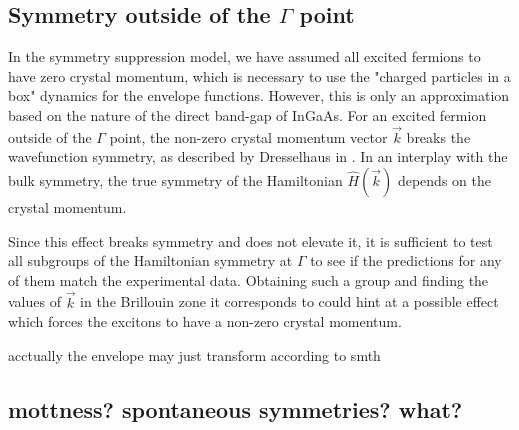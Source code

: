 \subsection{Symmetry outside of the $\Gamma$ point}
In the symmetry suppression model, we have assumed all excited fermions to have zero crystal momentum, which is necessary to use the "charged particles in a box" dynamics for the envelope functions. However, this is only an approximation based on the nature of the direct band-gap of InGaAs. For an excited fermion outside of the $\Gamma$ point, the non-zero crystal momentum vector $\vec{k}$ breaks the wavefunction symmetry, as described by Dresselhaus in \cite[Ch. 13]{dresselhaus}. In an interplay with the bulk symmetry, the true symmetry of the Hamiltonian $\hat{H}\left(\vec{k}\right)$ depends on the crystal momentum.

Since this effect breaks symmetry and does not elevate it, it is sufficient to test all subgroups of the Hamiltonian symmetry at $\Gamma$ to see if the predictions for any of them match the experimental data. Obtaining such a group and finding the values of $\vec{k}$ in the Brillouin zone it corresponds to could hint at a possible effect which forces the excitons to have a non-zero crystal momentum.

acctually the envelope may just transform according to smth

\subsection{mottness? spontaneous symmetries? what?}
